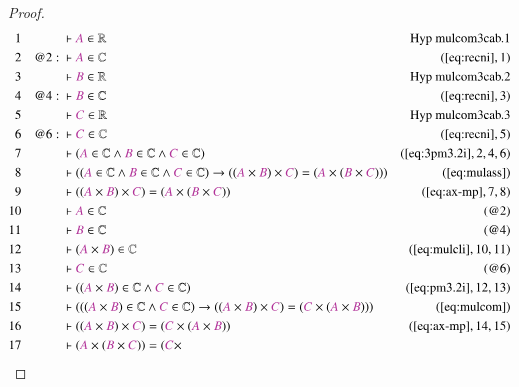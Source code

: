 \begin{proof}
\begin{align}
  1 &&  & \vdash \mc{A} \in
\mathbb{R}&\text{Hyp~mulcom3cab.1}\notag%
  \\ 2 && @2:\  & \vdash \mc{A} \in \mathbb{C}&(\mbox{\ref{eq:recni}},1)\notag
  \\ 3 &&  & \vdash \mc{B} \in
\mathbb{R}&\text{Hyp~mulcom3cab.2}\notag%
  \\ 4 && @4:\  & \vdash \mc{B} \in \mathbb{C}&(\mbox{\ref{eq:recni}},3)\notag
  \\ 5 &&  & \vdash \mc{C} \in
\mathbb{R}&\text{Hyp~mulcom3cab.3}\notag%
  \\ 6 && @6:\  & \vdash \mc{C} \in \mathbb{C}&(\mbox{\ref{eq:recni}},5)\notag
  \\ 7 &&  & \vdash ( \mc{A} \in \mathbb{C} \wedge \mc{B} \in \mathbb{C} \wedge
      \mc{C} \in \mathbb{C}
      )&(\mbox{\ref{eq:3pm3.2i}},2,4,6)\notag
  \\ 8 &&  & \vdash ( ( \mc{A} \in \mathbb{C} \wedge \mc{B} \in \mathbb{C}
      \wedge \mc{C} \in \mathbb{C} ) \rightarrow ( ( \mc{A}
      \times \mc{B} ) \times \mc{C} ) = ( \mc{A} \times (
      \mc{B} \times \mc{C} ) )
      )&(\mbox{\ref{eq:mulass}})\notag
  \\ 9 &&  & \vdash ( ( \mc{A} \times \mc{B} ) \times \mc{C} ) = ( \mc{A} \times (
      \mc{B} \times \mc{C} )
      )&(\mbox{\ref{eq:ax-mp}},7,8)\notag
  \\ 10 &&  & \vdash \mc{A} \in \mathbb{C}&(@2)\notag
  \\ 11 &&  & \vdash \mc{B} \in \mathbb{C}&(@4)\notag
  \\ 12 &&  & \vdash ( \mc{A} \times \mc{B} ) \in
      \mathbb{C}&(\mbox{\ref{eq:mulcli}},10,11)\notag
  \\ 13 &&  & \vdash \mc{C} \in \mathbb{C}&(@6)\notag
  \\ 14 &&  & \vdash ( ( \mc{A} \times \mc{B} ) \in \mathbb{C} \wedge \mc{C} \in
      \mathbb{C} )&(\mbox{\ref{eq:pm3.2i}},12,13)\notag
  \\ 15 &&  & \vdash ( ( ( \mc{A} \times \mc{B} ) \in \mathbb{C} \wedge \mc{C}
      \in \mathbb{C} ) \rightarrow ( ( \mc{A} \times \mc{B}
      ) \times \mc{C} ) = ( \mc{C} \times ( \mc{A} \times
      \mc{B} ) ) )&(\mbox{\ref{eq:mulcom}})\notag
  \\ 16 &&  & \vdash ( ( \mc{A} \times \mc{B} ) \times \mc{C} ) = ( \mc{C} \times
      ( \mc{A} \times \mc{B} )
      )&(\mbox{\ref{eq:ax-mp}},14,15)\notag
  \\ 17 &&  & \vdash ( \mc{A} \times ( \mc{B} \times \mc{C} ) ) = ( \mc{C} \times

\end{align}
\end{proof}
